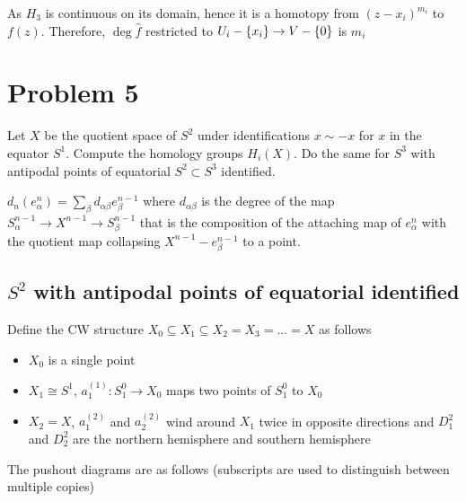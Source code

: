 \documentclass{article}
\begin{document}
As $H_3$ is continuous on its domain, hence it is a homotopy from $(z - x_i)^{m_i}$ to $f(z)$. Therefore, $\deg \hat{f}$ restricted to $U_i - \{x_i\} \to V - \{0\}$ is $m_i$

\section{Problem 5}
Let $X$ be the quotient space of $S^2$ under identifications $x \sim -x$ for $x$ in the equator $S^1$. Compute the homology groups $H_i(X)$. Do the same for $S^3$ with antipodal points of equatorial $S^2 \subset S^3$ identified.

\begin{proposition}
    $d_n(e^n_\alpha) = \sum_\beta d_{\alpha \beta} e^{n-1}_\beta$ where $d_{\alpha \beta}$ is the degree of the map $S^{n-1}_\alpha \to X^{n-1} \to S^{n-1}_\beta$ that is the composition of the attaching map of $e^n_\alpha$ with the quotient map collapsing $X^{n-1} - e^{n-1}_\beta$ to a point.
\end{proposition}

\subsection{$S^2$ with antipodal points of equatorial identified}

Define the CW structure $X_0 \subseteq X_1 \subseteq X_2 = X_3 = ... = X$ as follows

\begin{itemize}
    \item $X_0$ is a single point
    \item $X_1 \cong S^1$, $a^{(1)}_1: S^0_1 \to X_0$ maps two points of $S^0_1$ to $X_0$
    \item $X_2 = X$, $a^{(2)}_1$ and $a^{(2)}_2$ wind around $X_1$ twice in opposite directions and $D^2_1$ and $D^2_2$ are the northern hemisphere and southern hemisphere
\end{itemize}

The pushout diagrams are as follows (subscripts are used to distinguish between multiple copies)
\begin{center}
\end{center}
\end{document}
